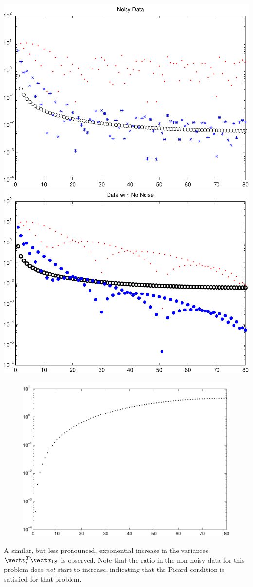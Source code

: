 \documentclass{homework}
\begin{document}
\begin{longproblem}
\includegraphics[width=.4\textwidth]{noisy_picard2.pdf}
\includegraphics[width=.4\textwidth]{no_noise_picard2.pdf}

\begin{figure}
\includegraphics[width=.4\textwidth]{variances2.pdf}
\end{figure}
 A similar, but less pronounced, exponential increase in the variances $\vect v_i^T \vect x_{\mathrm{LS}}$ is observed.  Note that the ratio in the non-noisy data for this problem does \emph{not} start to increase, indicating that the Picard condition is satisfied for that problem.
\end{longproblem}
\newpage
\end{document}
